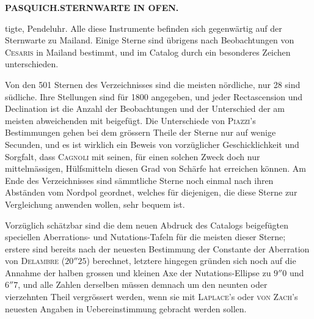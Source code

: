\clearpage
\endgroup
\begingroup
\pagestyle{empty}
\newcommand{\GaussVIGathering}[2]{%
  \fancypagestyle{gaussVIGathering}{%
    \fancyhf{}%
    \renewcommand{\headrulewidth}{0pt}%
    \renewcommand{\footrulewidth}{0pt}%
    \fancyfoot[C]{\makebox[\textwidth][l]{%
      \hspace*{.025\textwidth}{\footnotesize\bfseries #1}\hfill
      {\normalsize\bfseries\textls[90]{#2}}\hspace*{.18\textwidth}}}%
  }%
  \thispagestyle{gaussVIGathering}%
}
\thispagestyle{empty}
\noindent{}%
\makebox[12mm][l]{}%
\parbox[t]{\dimexpr\linewidth-24mm\relax}{\centering\footnotesize\bfseries PASQUICH.\enspace STERNWARTE IN OFEN.\par}%
\par\nobreak\medskip
\noindent tigte, Pendeluhr. Alle diese Instrumente befinden sich gegenwärtig auf der Sternwarte zu Mailand. Einige Sterne sind übrigens nach Beobachtungen von \textsc{Cesaris} in Mailand bestimmt, und im Catalog durch ein besonderes Zeichen unterschieden.

Von den 501 Sternen des Verzeichnisses sind die meisten nördliche, nur 28 sind südliche. Ihre Stellungen sind für 1800 angegeben, und jeder Rectascension und Declination ist die Anzahl der Beobachtungen und der Unterschied der am meisten abweichenden mit beigefügt. Die Unterschiede von \textsc{Piazzi}'s Bestimmungen gehen bei dem grössern Theile der Sterne nur auf wenige Secunden, und es ist wirklich ein Beweis von vorzüglicher Geschicklichkeit und Sorgfalt, dass \textsc{Cagnoli} mit seinen, für einen solchen Zweck doch nur mittelmässigen, Hülfsmitteln diesen Grad von Schärfe hat erreichen können. Am Ende des Verzeichnisses sind sämmtliche Sterne noch einmal nach ihren Abständen vom Nordpol geordnet, welches für diejenigen, die diese Sterne zur Vergleichung anwenden wollen, sehr bequem ist.

Vorzüglich schätzbar sind die dem neuen Abdruck des Catalogs beigefügten speciellen Aberrations- und Nutations-Tafeln für die meisten dieser Sterne; erstere sind bereits nach der neuesten Bestimmung der Constante der Aberration von \textsc{Delambre} ($20''25$) berechnet, letztere hingegen gründen sich noch auf die Annahme der halben grossen und kleinen Axe der Nutations-Ellipse zu $9''0$ und $6''7$, und alle Zahlen derselben müssen demnach um den neunten oder vierzehnten Theil vergrössert werden, wenn sie mit \textsc{Laplace}'s oder \textsc{von Zach}'s neuesten Angaben in Uebereinstimmung gebracht werden sollen.
